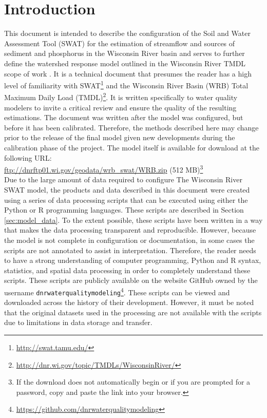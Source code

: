 \section{Introduction}
This document is intended to describe the configuration of the Soil and
Water Assessment Tool (SWAT) \citep{arnold_swat_1994} for the estimation of streamflow and sources
of sediment and phosphorus in the Wisconsin River basin and serves to further define the watershed response model 
outlined in the Wisconsin River TMDL scope of work . It is a technical
document that presumes the reader has a high level of familiarity with SWAT\footnote{\url{http://swat.tamu.edu/}} and
the Wisconsin River Basin (WRB) Total Maximum Daily Load (TMDL)\footnote{\url{http://dnr.wi.gov/topic/TMDLs/WisconsinRiver/}}.
It is written specifically to water quality
modelers to invite a critical review and ensure the quality of the resulting
estimations. The document was written after the model was configured, but before
it has been calibrated. Therefore, the methods described here may change prior
to the release of the final model given new developments during the calibration
phase of the project. The model itself is available for download at the following URL: \\

\url{ftp://dnrftp01.wi.gov/geodata/wrb_swat/WRB.zip} (512 MB)\footnote{If the download does not automatically begin or if you are prompted for a password, copy and paste the link into your browser.}\\

Due to the large amount of data required to configure The Wisconsin River SWAT model, the
products and data described in this document were created using a series of data 
processing scripts
that can be executed using either the Python or R programming languages. These scripts
are described in Section \ref{sec:model_data}. To the
extent possible, these scripts have been written in a way that makes
the data processing transparent and reproducible. However, because the model is
not complete in configuration or documentation, in some cases the scripts are not
annotated to assist in interpretation. Therefore, the reader needs to have a
strong understanding of computer programming, Python and R syntax, statistics,
and spatial data processing in order to completely understand these scripts. These scripts are publicly available on the
website GitHub owned by the username
\texttt{dnrwaterqualitymodeling}\footnote{\url{https://github.com/dnrwaterqualitymodeling}}. 
These scripts can be viewed and downloaded
across the history of their development. However, it must be noted that the
original datasets used in the processing are not available with the scripts due
to limitations in data storage and transfer.

